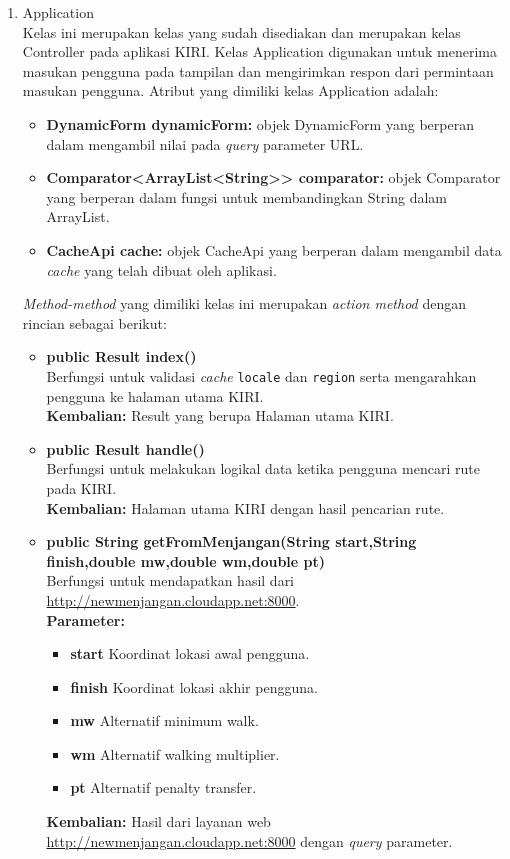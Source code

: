 \begin{enumerate}
	\item Application\\
	Kelas ini merupakan kelas yang sudah disediakan \play dan merupakan kelas Controller pada aplikasi KIRI. Kelas Application digunakan untuk menerima masukan pengguna pada tampilan dan mengirimkan respon dari permintaan masukan pengguna. Atribut yang dimiliki kelas Application adalah:
	\begin{itemize}
		\item \textbf{DynamicForm dynamicForm:} objek DynamicForm yang berperan dalam mengambil nilai pada \textit{query} parameter URL. 
		\item \textbf{Comparator<ArrayList<String>{}> comparator:} objek Comparator yang berperan dalam fungsi untuk membandingkan String dalam ArrayList.
		\item \textbf{CacheApi cache:} objek CacheApi yang berperan dalam mengambil data \textit{cache} yang telah dibuat oleh aplikasi.
		
	\end{itemize}
	\textit{Method-method} yang dimiliki kelas ini merupakan \textit{action method} dengan rincian sebagai berikut:
	\begin{itemize}
		\item \textbf{public Result index()}\\
		Berfungsi untuk validasi \textit{cache} \verb!locale! dan \verb!region! serta mengarahkan pengguna ke halaman utama KIRI.\\
		\textbf{Kembalian:}  Result yang berupa Halaman utama KIRI.
		
		\item \textbf{public Result handle()}\\
		Berfungsi untuk melakukan logikal data ketika pengguna mencari rute pada KIRI.\\
		\textbf{Kembalian:}  Halaman utama KIRI dengan hasil pencarian rute.
		
		\item \textbf{public String getFromMenjangan(String start,String finish,double mw,double wm,double pt)}\\
		Berfungsi untuk mendapatkan hasil dari \url{http://newmenjangan.cloudapp.net:8000}.\\
		\textbf{Parameter:}
				\begin{itemize}
					\item \textbf{start} Koordinat lokasi awal pengguna.
					\item \textbf{finish} Koordinat lokasi akhir pengguna.
					\item \textbf{mw} Alternatif minimum walk.
					\item \textbf{wm} Alternatif walking multiplier.
					\item \textbf{pt} Alternatif penalty transfer.
				\end{itemize}
		\textbf{Kembalian:}  Hasil dari layanan web \url{http://newmenjangan.cloudapp.net:8000} dengan \textit{query} parameter.
		

\end{itemize}
\end{enumerate}
